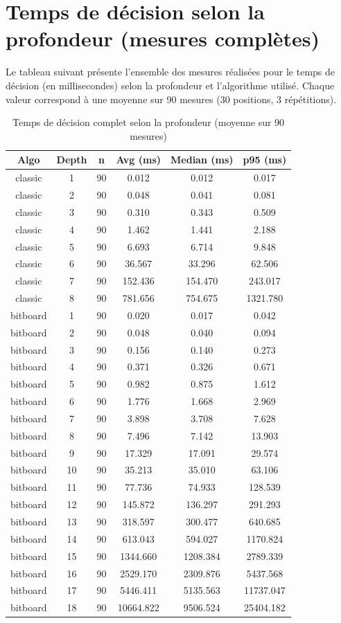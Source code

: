 \documentclass[11pt,a4paper]{article}
\begin{document}
\clearpage
\section{Temps de décision selon la profondeur (mesures complètes)}
\label{annexe:resultats_complets}

Le tableau suivant présente l’ensemble des mesures réalisées pour le temps de décision (en millisecondes) selon la profondeur et l’algorithme utilisé. 
Chaque valeur correspond à une moyenne sur 90 mesures (30 positions, 3 répétitions).

\begin{table}[H]
\centering
\begin{tabular}{|c|c|c|c|c|c|}
\hline
Algo & Depth & n & Avg (ms) & Median (ms) & p95 (ms) \\
\hline
classic & 1 & 90 & 0.012 & 0.012 & 0.017 \\
classic & 2 & 90 & 0.048 & 0.041 & 0.081 \\
classic & 3 & 90 & 0.310 & 0.343 & 0.509 \\
classic & 4 & 90 & 1.462 & 1.441 & 2.188 \\
classic & 5 & 90 & 6.693 & 6.714 & 9.848 \\
classic & 6 & 90 & 36.567 & 33.296 & 62.506 \\
classic & 7 & 90 & 152.436 & 154.470 & 243.017 \\
classic & 8 & 90 & 781.656 & 754.675 & 1321.780 \\
\hline
bitboard & 1 & 90 & 0.020 & 0.017 & 0.042 \\
bitboard & 2 & 90 & 0.048 & 0.040 & 0.094 \\
bitboard & 3 & 90 & 0.156 & 0.140 & 0.273 \\
bitboard & 4 & 90 & 0.371 & 0.326 & 0.671 \\
bitboard & 5 & 90 & 0.982 & 0.875 & 1.612 \\
bitboard & 6 & 90 & 1.776 & 1.668 & 2.969 \\
bitboard & 7 & 90 & 3.898 & 3.708 & 7.628 \\
bitboard & 8 & 90 & 7.496 & 7.142 & 13.903 \\
bitboard & 9 & 90 & 17.329 & 17.091 & 29.574 \\
bitboard & 10 & 90 & 35.213 & 35.010 & 63.106 \\
bitboard & 11 & 90 & 77.736 & 74.933 & 128.539 \\
bitboard & 12 & 90 & 145.872 & 136.297 & 291.293 \\
bitboard & 13 & 90 & 318.597 & 300.477 & 640.685 \\
bitboard & 14 & 90 & 613.043 & 594.027 & 1170.824 \\
bitboard & 15 & 90 & 1344.660 & 1208.384 & 2789.339 \\
bitboard & 16 & 90 & 2529.170 & 2309.876 & 5437.568 \\
bitboard & 17 & 90 & 5446.411 & 5135.563 & 11737.047 \\
bitboard & 18 & 90 & 10664.822 & 9506.524 & 25404.182 \\
\hline
\end{tabular}
\caption{Temps de décision complet selon la profondeur (moyenne sur 90 mesures)}
\end{table}
\end{document}

